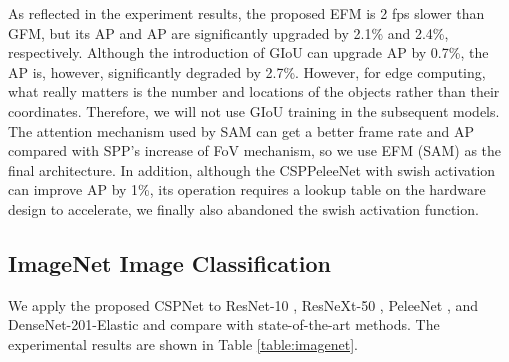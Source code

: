 \documentclass{article}
\begin{document}
As reflected in the experiment results, the proposed EFM is 2 fps slower than GFM, but its AP and AP are significantly upgraded by 2.1\% and 2.4\%, respectively.  Although the introduction of GIoU can upgrade AP by 0.7\%, the AP is, however, significantly degraded by 2.7\%.  However, for edge computing, what really matters is the number and locations of the objects rather than their coordinates.  Therefore, we will not use GIoU training in the subsequent models.  The attention mechanism used by SAM can get a better frame rate and AP compared with SPP's increase of FoV mechanism, so we use EFM (SAM) as the final architecture.  In addition, although the CSPPeleeNet with swish activation can improve AP by 1\%, its operation requires a lookup table on the hardware design to accelerate, we finally also abandoned the swish activation function.

\subsection{ImageNet Image Classification}

We apply the proposed CSPNet to ResNet-10 \cite{he2016deep}, ResNeXt-50 \cite{xie2017aggregated}, PeleeNet \cite{wang2018pelee}, and DenseNet-201-Elastic \cite{wang2019elastic} and compare with state-of-the-art methods.  The experimental results are shown in Table \ref{table:imagenet}.
\end{document}
